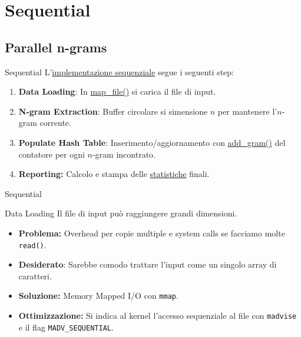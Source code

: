 \section{Sequential}
\subsection{Parallel n-grams}

\begin{frame}{Sequential}
    L'\href{https://github.com/edoardosarri24/parallel-n_grams/blob/master/sequential/src/main.c}{implementazione sequenziale} segue i seguenti step:
    \begin{enumerate}
        \item \textbf{Data Loading}: In \href{https://github.com/edoardosarri24/parallel-n_grams/blob/dc9c6109a6f815b851e6ed46a0fc79046be69371/sequential/src/main_functions.c}{map\_file()} si carica il file di input.
        \item \textbf{N-gram Extraction}: Buffer circolare si simensione $n$ per mantenere l'$n$-gram corrente.
        \item \textbf{Populate Hash Table}: Inserimento/aggiornamento con \href{https://github.com/edoardosarri24/parallel-n_grams/blob/dc9c6109a6f815b851e6ed46a0fc79046be69371/sequential/src/hash_table.c}{add\_gram()} del contatore per ogni $n$-gram incontrato.
        \item \textbf{Reporting:} Calcolo e stampa delle \href{https://github.com/edoardosarri24/parallel-n_grams/blob/dc9c6109a6f815b851e6ed46a0fc79046be69371/sequential/src/statistics.c}{statistiche} finali.
    \end{enumerate}
\end{frame}

\begin{frame}{Sequential}
    \begin{block}{Data Loading}
        Il file di input può raggiungere grandi dimensioni.
        \begin{itemize}
            \item \textbf{Problema:} Overhead per copie multiple e system calls se facciamo molte \texttt{read()}.
            \item \textbf{Desiderato}: Sarebbe comodo trattare l'input come un singolo array di caratteri.
            \item \textbf{Soluzione:} Memory Mapped I/O  con \texttt{mmap}.
            \item \textbf{Ottimizzazione:} Si indica al kernel l'accesso sequenziale al file con \texttt{madvise} e il flag \texttt{MADV\_SEQUENTIAL}.
        \end{itemize}
    \end{block}
\end{frame}

